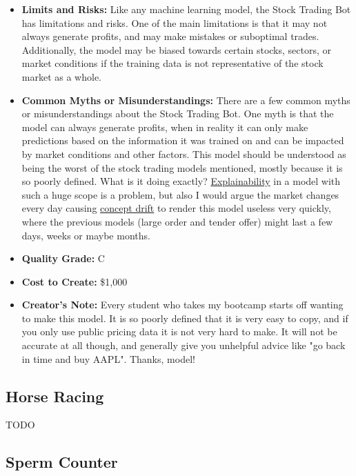 \begin{itemize}
\begin{enumerate}
        \end{enumerate}
    \item \textbf{Limits and Risks:} Like any machine learning model, the Stock Trading Bot has limitations and risks. One of the main limitations is that it may not always generate profits, and may make mistakes or suboptimal trades. Additionally, the model may be biased towards certain stocks, sectors, or market conditions if the training data is not representative of the stock market as a whole.
    \item \textbf{Common Myths or Misunderstandings:} There are a few common myths or misunderstandings about the Stock Trading Bot. One myth is that the model can always generate profits, when in reality it can only make predictions based on the information it was trained on and can be impacted by market conditions and other factors. This model should be understood as being the worst of the stock trading models mentioned, mostly because it is so poorly defined. What is it doing exactly? \hyperref[sec:explain]{Explainability} in a model with such a huge scope is a problem, but also I would argue the market changes every day causing \hyperref[sec:drift]{concept drift} to render this model useless very quickly, where the previous models (large order and tender offer) might last a few days, weeks or maybe months.
    \item \textbf{Quality Grade:} C
    \item \textbf{Cost to Create:} \$1,000
    \item \textbf{Creator's Note:} Every student who takes my bootcamp starts off wanting to make this model. It is so poorly defined that it is very easy to copy, and if you only use public pricing data it is not very hard to make. It will not be accurate at all though, and generally give you unhelpful advice like "go back in time and buy AAPL". Thanks, model! 
\end{itemize}

\subsection{Horse Racing}

TODO

\subsection{Sperm Counter}

